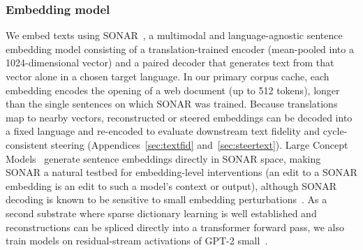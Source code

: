 \subsubsection{Embedding model}
\label{sec:sonar}
We embed texts using SONAR~\cite{sonar}, a multimodal and
language-agnostic sentence embedding model consisting of a
translation-trained encoder (mean-pooled into a 1024-dimensional vector)
and a paired decoder that generates text from that vector alone in a
chosen target language. In our primary corpus cache, each embedding
encodes the opening of a web document (up to 512 tokens), longer than the
single sentences on which SONAR was trained. Because translations map to
nearby vectors, reconstructed or steered embeddings can be decoded into a
fixed language and re-encoded to evaluate downstream text fidelity and
cycle-consistent steering (Appendices~\ref{sec:textfid}
and~\ref{sec:steertext}). Large Concept
Models~\cite{lcmteam2024largeconceptmodelslanguage} generate sentence
embeddings directly in SONAR space, making SONAR a natural testbed for
embedding-level interventions (an edit to a SONAR embedding is an edit to
such a model's context or output), although SONAR decoding is known to be
sensitive to small embedding
perturbations~\cite{lcmteam2024largeconceptmodelslanguage}. As a second
substrate where sparse dictionary learning is well established and
reconstructions can be spliced directly into a transformer forward pass,
we also train models on residual-stream activations of GPT-2
small~\cite{radford2019}.

